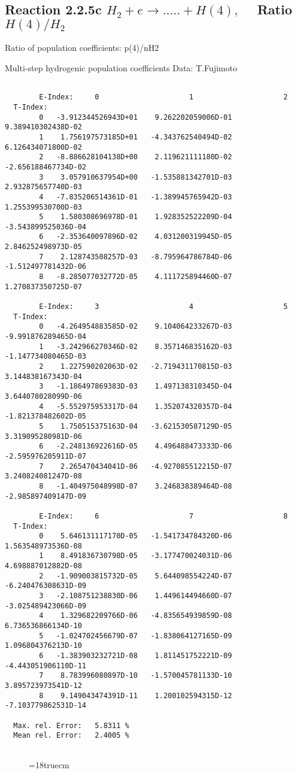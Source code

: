 \subsection{
Reaction 2.2.5c  $H_2 + e \rightarrow .....+H(4)   , \quad $
Ratio $H(4)/H_2 $
}

 Ratio of population coefficients: p(4)/nH2

 Multi-step hydrogenic population coefficients
 Data: T.Fujimoto

\begin{verbatim}

        E-Index:     0                     1                     2
  T-Index:
        0   -3.912344526943D+01    9.262202059006D-01    9.389410302438D-02
        1    1.756197573185D+01   -4.343762540494D-02    6.126434071800D-02
        2   -8.886628104138D+00    2.119621111180D-02   -2.656188467734D-02
        3    3.057910637954D+00   -1.535881342701D-03    2.932875657740D-03
        4   -7.835206514361D-01   -1.389945765942D-03    1.255399530700D-03
        5    1.580308696978D-01    1.928352522209D-04   -3.543899525036D-04
        6   -2.353640097896D-02    4.031200319945D-05    2.846252498973D-05
        7    2.128743508257D-03   -8.795964786784D-06   -1.512497781432D-06
        8   -8.285077032772D-05    4.111725894460D-07    1.270837350725D-07

        E-Index:     3                     4                     5
  T-Index:
        0   -4.264954883585D-02    9.104064233267D-03   -9.991876289465D-04
        1   -3.242966270346D-02    8.357146835162D-03   -1.147734080465D-03
        2    1.227590202063D-02   -2.719431170815D-03    3.144838167343D-04
        3   -1.186497869383D-03    1.497138310345D-04    3.644078028099D-06
        4   -5.552975953317D-04    1.352074320357D-04   -1.821378482602D-05
        5    1.750515375163D-04   -3.621530587129D-05    3.319095280981D-06
        6   -2.248136922616D-05    4.496488473333D-06   -2.595976205911D-07
        7    2.265470434041D-06   -4.927085512215D-07    3.240824081247D-08
        8   -1.404975048998D-07    3.246838389464D-08   -2.985897409147D-09

        E-Index:     6                     7                     8
  T-Index:
        0    5.646131117170D-05   -1.541734784320D-06    1.563548973536D-08
        1    8.491836730798D-05   -3.177470024031D-06    4.698887012882D-08
        2   -1.909003815732D-05    5.644098554224D-07   -6.240476308631D-09
        3   -2.108751238830D-06    1.449614494660D-07   -3.025489423066D-09
        4    1.329682209766D-06   -4.835654939859D-08    6.736536866134D-10
        5   -1.024702456679D-07   -1.838064127165D-09    1.096804376213D-10
        6   -1.383903232721D-08    1.811451752221D-09   -4.443051906110D-11
        7    8.783996080897D-10   -1.570045781133D-10    3.895723973541D-12
        8    9.149043474391D-11    1.200102594315D-12   -7.103779862531D-14

  Max. rel. Error:   5.8311 %
  Mean rel. Error:   2.4005 %


\end{verbatim}
\begin{figure} \label{2.2.5c}
\epsfxsize=18truecm
\end{figure}
\newpage
